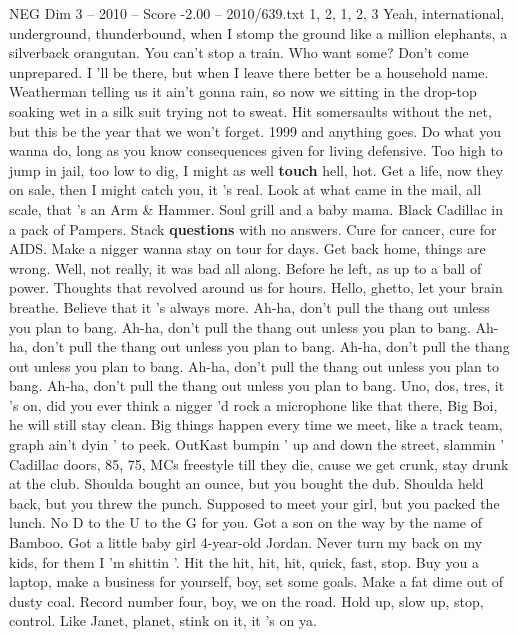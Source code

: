\begin{textsample}{NEG Dim 3 – 2010 – Score -2.00 – 2010/639.txt}  \label{ex:f3_neg_024}
1, 2, 1, 2, 3 Yeah, international, underground, thunderbound, when I stomp the ground like a million elephants, a silverback orangutan.
You can't stop a train.
Who want some?
Don't come unprepared.
I 'll be there, but when I leave there better be a household name.
Weatherman telling us it ain't gonna rain, so now we sitting in the drop-top soaking wet in a silk suit trying not to sweat.
Hit somersaults without the net, but this be the year that we won't forget. 1999 and anything goes.
Do what you wanna do, long as you know consequences given for living defensive.
Too high to jump in jail, too low to dig, I might as well \textbf{touch} hell, hot.
Get a life, now they on sale, then I might catch you, it 's real.
Look at what came in the mail, all scale, that 's an Arm \& Hammer.
Soul grill and a baby mama.
Black Cadillac in a pack of Pampers.
Stack \textbf{questions} with no answers.
Cure for cancer, cure for AIDS.
Make a nigger wanna stay on tour for days.
Get back home, things are wrong.
Well, not really, it was bad all along.
Before he left, as up to a ball of power.
Thoughts that revolved around us for hours.
Hello, ghetto, let your brain breathe.
Believe that it 's always more.
Ah-ha, don't pull the thang out unless you plan to bang.
Ah-ha, don't pull the thang out unless you plan to bang.
Ah-ha, don't pull the thang out unless you plan to bang.
Ah-ha, don't pull the thang out unless you plan to bang.
Ah-ha, don't pull the thang out unless you plan to bang.
Ah-ha, don't pull the thang out unless you plan to bang.
Uno, dos, tres, it 's on, did you ever think a nigger 'd rock a microphone like that there, Big Boi, he will still stay clean.
Big things happen every time we meet, like a track team, graph ain't dyin ' to peek.
OutKast bumpin ' up and down the street, slammin ' Cadillac doors, 85, 75, MCs freestyle till they die, cause we get crunk, stay drunk at the club.
Shoulda bought an ounce, but you bought the dub.
Shoulda held back, but you threw the punch.
Supposed to meet your girl, but you packed the lunch.
No D to the U to the G for you.
Got a son on the way by the name of Bamboo.
Got a little baby girl 4-year-old Jordan.
Never turn my back on my kids, for them I 'm shittin '.
Hit the hit, hit, hit, quick, fast, stop.
Buy you a laptop, make a business for yourself, boy, set some goals.
Make a fat dime out of dusty coal.
Record number four, boy, we on the road.
Hold up, slow up, stop, control.
Like Janet, planet, stink on it, it 's on ya.

\end{textsample}
